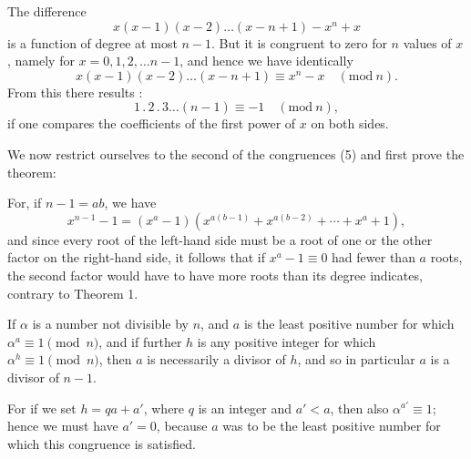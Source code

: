 The difference
\[
x(x-1)(x-2)\dots(x-n+1) - x^n + x
\]
is a function of degree at most $n-1$. But it is congruent
to zero for $n$ values of $x$, namely for $x = 0, 1, 2, \dots n-1$, and hence we have identically
\[
x(x-1)(x-2)\dots(x-n+1) \equiv x^n - x \quad (\mathrm{mod}\ n).
\]
From this there results :
\[
1\,.\,2\,.\,3\dots(n-1) \equiv -1 \quad (\mathrm{mod}\ n),
\]
if one compares the coefficients of the first power of $x$ on both
sides.

We now restrict ourselves to the second of the congruences (5)
and first prove the theorem:


For, if $n-1 = ab$, we have
\[
x^{n-1} - 1 = (x^a - 1)(x^{a(b-1)} + x^{a(b-2)} + \cdots + x^a + 1),
\]
and since every root of the left-hand side must be a root of
one or the other factor on the right-hand side, it follows that
if $x^a - 1 \equiv 0$ had fewer than $a$ roots, the second factor
would have to have more roots than its degree indicates,
contrary to Theorem 1.

If $\alpha$ is a number not divisible by $n$, and $a$ is the least
positive number for which $\alpha^a \equiv 1 \pmod n$, and if further $h$ is any
positive integer for which $\alpha^h \equiv 1 \pmod n$, then $a$ is
necessarily a divisor of $h$, and so in particular $a$ is a divisor
of $n - 1$.

For if we set $h = qa + a'$, where $q$ is an integer and
$a' < a$, then also $\alpha^{a'} \equiv 1$; hence we must have $a' = 0$, because $a$ was to be the
least positive number for which this congruence is satisfied.

